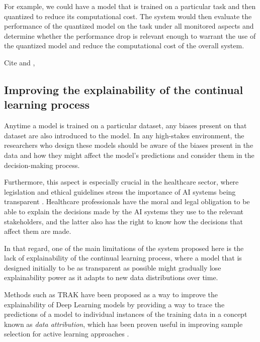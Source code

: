 \documentclass[../main.tex]{subfiles}
\begin{document}
    For example, we could have a model that is trained on a particular task and then quantized to reduce its computational cost. The system would then evaluate the performance of the quantized model on the task under all monitored aspects and determine whether the performance drop is relevant enough to warrant the use of the quantized model and reduce the computational cost of the overall system.

    Cite \cite{carreira-perpinan_model_2017} and \cite{han_deep_2016}, \cite{carreira-perpinan_compression_2018}

    \subsection{
        Improving the explainability of the continual learning process 
    } \label{conclusions:future_work:explainability}

    Anytime a model is trained on a particular dataset, any biases present on that dataset are also introduced to the model. In any high-stakes environment, the researchers who design these models should be aware of the biases present in the data and how they might affect the model's predictions and consider them in the decision-making process.

    Furthermore, this aspect is especially crucial in the healthcare sector, where legislation and ethical guidelines stress the importance of AI systems being transparent \cite{noauthor_ethics_2019,eu_aiact_2023}. Healthcare professionals have the moral and legal obligation to be able to explain the decisions made by the AI systems they use to the relevant stakeholders, and the latter also has the right to know how the decisions that affect them are made.
    
    In that regard, one of the main limitations of the system proposed here is the lack of explainability of the continual learning process, where a model that is designed initially to be as transparent as possible might gradually lose explainability power as it adapts to new data distributions over time.
    
    
    
    Methods such as TRAK \cite{park_trak_2023} have been proposed as a way to improve the explainability of Deep Learning models by providing a way to trace the predictions of a model to individual instances of the training data in a concept known as \textit{data attribution}, which has been proven useful in improving sample selection for active learning approaches \cite{park_trak_2023, holzmuller_framework_2023, liu_influence_2021}.
\end{document}
